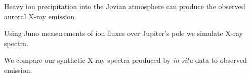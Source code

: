 \documentclass[draft]{agujournal2018}
\begin{document}
\begin{keypoints}
\item Heavy ion precipitation into the Jovian atmosphere can produce the observed auroral X-ray emission.
\item Using Juno measurements of ion fluxes over Jupiter's pole we simulate X-ray spectra.
\item We compare our synthetic X-ray spectra produced by \textit{in situ} data to observed emission.
\end{keypoints}

%
%

\end{document}
